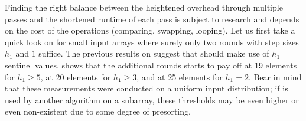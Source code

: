 Finding the right balance between the heightened overhead through multiple \IS{} passes and the shortened runtime of each \IS{} pass is subject to research and depends on the cost of the operations (comparing, swapping, looping).
Let us first take a quick look on \ShS{} for small input arrays where surely only two rounds with step sizes \(h_1\) and \(1\) suffice.
The previous results on \IS{} suggest that \ShS{} should make use of \(h_1\) sentinel values.
 shows that the additional rounds starts to pay off at 19 elements for \(h_1 \ge 5\), at 20 elements for \(h_1 \ge 3\), and at 25 elements for \(h_1 = 2\).
Bear in mind that these measurements were conducted on a uniform input distribution;
if \ShS{} is used by another algorithm on a subarray, these thresholds may be even higher or even non-existent due to some degree of presorting.
